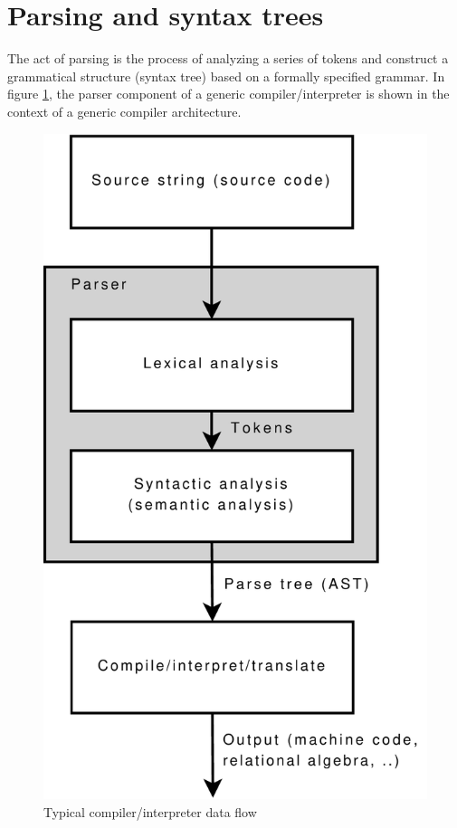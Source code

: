 \section{Parsing and syntax trees}
\label{sect:parser_and_syntaxtrees}
The act of parsing is the process of analyzing a series of tokens and construct
a grammatical structure (syntax tree) based on a formally specified grammar. In
figure \ref{figure:parser:overview}, the parser component of a generic
compiler/interpreter is shown in the context of a generic compiler
architecture.

\begin{figure}[h]
  \centering
    \includegraphics[scale=0.40]{diagrams/parser_overview}
  \caption{Typical compiler/interpreter data flow}
  \label{figure:parser:overview}
\end{figure}


